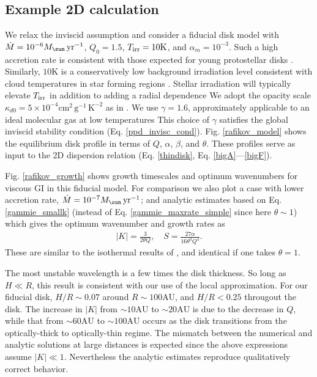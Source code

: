 \subsection{Example 2D calculation}\label{pp2d_example}
We relax the inviscid assumption and consider a fiducial disk  model with
$\dot{M} = 10^{-6}M_\sun\,\yr^{-1}$, $Q_0=1.5$,  
$T_\mathrm{irr}=10\mathrm{K}$, and $\alpha_m=10^{-3}$. 
Such a high accretion rate is consistent with those expected for 
young protostellar disks \citep{shu77,enoch09}. Similarly,
$10\mathrm{K}$ is a conservatively low background irradiation level
consistent with cloud temperatures in star forming regions
\citep{plume97,johnstone01}. 
Stellar irradiation will typically elevate $T_\mathrm{irr}$ in addition to
adding a radial dependence \citep{kratter08} 
We adopt the opacity scale $\kappa_{d0} =
5\times10^{-4}\mathrm{cm}^2\,\mathrm{g}^{-1}\,\mathrm{K}^{-2}$  as in
. We use $\gamma=1.6$, approximately applicable
to an ideal molecular gas at low temperatures 
This choice of $\gamma$ satisfies the global inviscid stability condition
(Eq. \ref{ppd_invisc_cond}). %
Fig. \ref{rafikov_model} shows the equilibrium 
disk profile in terms of $Q$, $\alpha$, $\beta$, and $\theta$.  
These profiles serve as input to the 2D dispersion relation
(Eq. \ref{thindisk}, Eq. \ref{bigA}---\ref{bigF}). 

Fig. \ref{rafikov_growth} shows growth timescales and
optimum wavenumbers for viscous GI in this fiducial model. For
comparison we also plot a case with lower accretion rate, 
$\dot{M}=10^{-7}M_\sun\,\yr^{-1}$; and analytic estimates based on
Eq. \ref{gammie_smallk} (instead of Eq. \ref{gammie_maxrate_simple}
since here $\theta\sim 1$) which gives the optimum wavenumber and
growth rates as 
\begin{align}
  |K| = \frac{3}{2\theta Q}, \quad
  S = \frac{27\alpha}{16\theta^3Q^4}. 
\end{align}
These are similar to the isothermal results of
\citet[][their Eq. 19 and 21, respectively]{sterzik95}, and identical if one
takes $\theta=1$. %
 
The most unstable wavelength is a few times the disk thickness. 
So long as $H\ll R$, this result is consistent with our use of the
local approximation. For our fiducial disk, $H/R \sim 0.07$ around 
$R\sim 100$AU, and $H/R <0.25$ througout the disk. 
The increase in $|K|$ from 
$\sim 10\mathrm{AU}$ to $\sim 20\mathrm{AU}$ is due to the decrease in
$Q$, while that from $\sim 
60\mathrm{AU}$ to $\sim 100\mathrm{AU}$ occurs as the disk transitions
from the 
optically-thick to optically-thin regime. The mismatch between the
numerical and analytic solutions at large
distances is expected since the above expressions assume $|K|\ll
1$. Nevertheless the analytic estimates reproduce qualitatively correct
behavior. 

